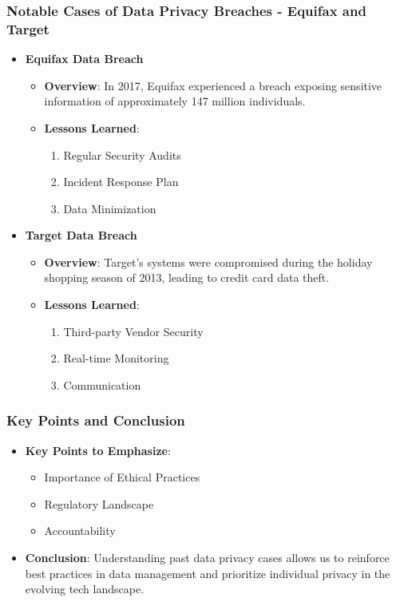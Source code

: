 \documentclass[aspectratio=169]{beamer}
\begin{document}
\begin{frame}[fragile]
    \frametitle{Notable Cases of Data Privacy Breaches - Equifax and Target}
    \begin{itemize}
        \item \textbf{Equifax Data Breach}
        \begin{itemize}
            \item \textbf{Overview}: In 2017, Equifax experienced a breach exposing sensitive information of approximately 147 million individuals.
            \item \textbf{Lessons Learned}:
            \begin{enumerate}
                \item Regular Security Audits
                \item Incident Response Plan
                \item Data Minimization
            \end{enumerate}
        \end{itemize}
        
        \item \textbf{Target Data Breach}
        \begin{itemize}
            \item \textbf{Overview}: Target's systems were compromised during the holiday shopping season of 2013, leading to credit card data theft.
            \item \textbf{Lessons Learned}:
            \begin{enumerate}
                \item Third-party Vendor Security
                \item Real-time Monitoring
                \item Communication
            \end{enumerate}
        \end{itemize}
    \end{itemize}
\end{frame}

\begin{frame}[fragile]
    \frametitle{Key Points and Conclusion}
    \begin{itemize}
        \item \textbf{Key Points to Emphasize}:
        \begin{itemize}
            \item Importance of Ethical Practices
            \item Regulatory Landscape
            \item Accountability
        \end{itemize}
        
        \item \textbf{Conclusion}:
        Understanding past data privacy cases allows us to reinforce best practices in data management and prioritize individual privacy in the evolving tech landscape.
    \end{itemize}
\end{frame}
\end{document}
